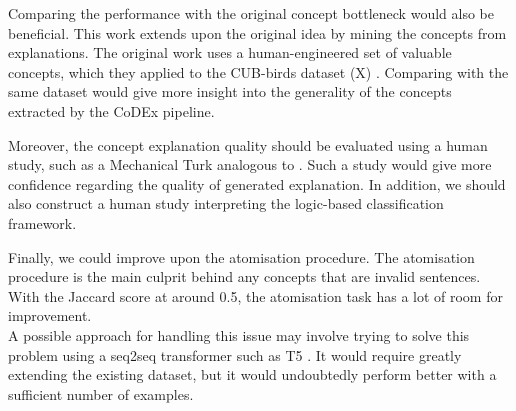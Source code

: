 Comparing the performance with the original concept bottleneck \cite{RefWorks:RefID:35-koh2020concept} would also be beneficial.
This work extends upon the original idea by mining the concepts from explanations.
The original work uses a human-engineered set of valuable concepts, which they applied to the CUB-birds dataset (X) \cite{RefWorks:RefID:69-wah2011caltech-ucsd}.
Comparing with the same dataset would give more insight into the generality of the concepts extracted by the CoDEx pipeline.


Moreover, the concept explanation quality should be evaluated using a human study, such as a Mechanical Turk analogous to \cite{RefWorks:RefID:16-2021automatic}.
Such a study would give more confidence regarding the quality of generated explanation.
In addition, we should also construct a human study interpreting the logic-based classification framework.

Finally, we could improve upon the atomisation procedure.
The atomisation procedure is the main culprit behind any concepts that are invalid sentences.
With the Jaccard score at around 0.5, the atomisation task has a lot of room for improvement. \\
A possible approach for handling this issue may involve trying to solve this problem using a seq2seq transformer such as T5 \cite{RefWorks:RefID:88-raffel2020exploring}.
It would require greatly extending the existing dataset, but it would undoubtedly perform better with a sufficient number of examples.
